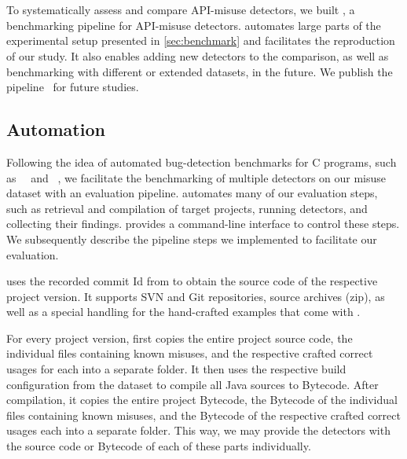 
\section{\MUPipe}
\label{sub:the_pipeline}

To systematically assess and compare API-misuse detectors, we built \MUPipe, a benchmarking pipeline for API-misuse detectors.
\MUPipe automates large parts of the experimental setup presented in \autoref{sec:benchmark} and facilitates the reproduction of our study.
It also enables adding new detectors to the comparison, as well as benchmarking with different or extended datasets, in the future.
We publish the pipeline~\cite{mubench} for future studies.


\subsection{Automation}

Following the idea of automated bug-detection benchmarks for C programs, such as~~\cite{LLQ+05} and ~\cite{CHKL+09}, we facilitate the benchmarking of multiple detectors on our misuse dataset with an evaluation pipeline.
\MUPipe automates many of our evaluation steps, such as retrieval and compilation of target projects, running detectors, and collecting their findings.
\MUPipe provides a command-line interface to control these steps.
We subsequently describe the pipeline steps we implemented to facilitate our evaluation.

\MUPipe uses the recorded commit Id from \MUBench to obtain the source code of the respective project version.
It supports SVN and Git repositories, source archives (zip), as well as a special handling for the hand-crafted examples that come with \MUBench.

For every project version, \MUPipe first copies the entire project source code, the individual files containing known misuses, and the respective crafted correct usages for  each into a separate folder.
It then uses the respective build configuration from the dataset to compile all Java sources to Bytecode.
After compilation, it copies the entire project Bytecode, the Bytecode of the individual files containing known misuses, and the Bytecode of the respective crafted correct usages each into a separate folder.
This way, we may provide the detectors with the source code or Bytecode of each of these parts individually.

